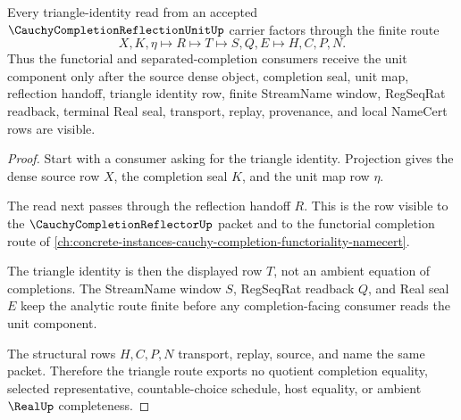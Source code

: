 \begin{theorem}
\label{thm:cauchy-completion-reflection-unit-triangle-identity}
Every triangle-identity read from an accepted $\CauchyCompletionReflectionUnitUp$ carrier factors through the finite route
$$
X,K,\eta \longmapsto R \longmapsto T \longmapsto S,Q,E \longmapsto H,C,P,N .
$$
Thus the functorial and separated-completion consumers receive the unit component only after the source dense object, completion seal, unit map, reflection handoff, triangle identity row, finite StreamName window, RegSeqRat readback, terminal Real seal, transport, replay, provenance, and local NameCert rows are visible.
\end{theorem}
\begin{proof}
Start with a consumer asking for the triangle identity. Projection gives the dense source row $X$, the completion seal $K$, and the unit map row $\eta$.

The read next passes through the reflection handoff $R$. This is the row visible to the $\CauchyCompletionReflectorUp$ packet and to the functorial completion route of \autoref{ch:concrete-instances-cauchy-completion-functoriality-namecert}.

The triangle identity is then the displayed row $T$, not an ambient equation of completions. The StreamName window $S$, RegSeqRat readback $Q$, and Real seal $E$ keep the analytic route finite before any completion-facing consumer reads the unit component.

The structural rows $H,C,P,N$ transport, replay, source, and name the same packet. Therefore the triangle route exports no quotient completion equality, selected representative, countable-choice schedule, host equality, or ambient $\RealUp$ completeness.
\end{proof}

